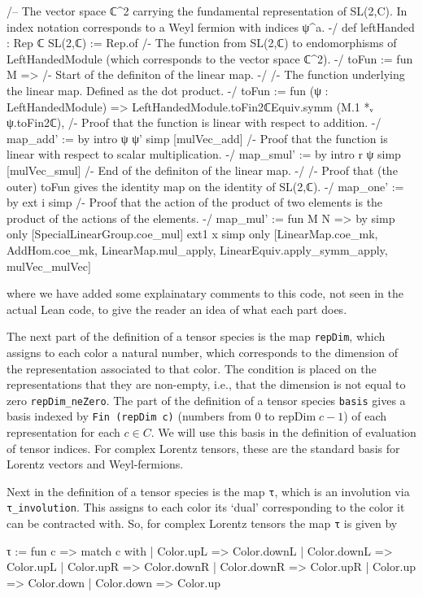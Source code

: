 \documentclass[a4paper, 11pt]{article}
\begin{document}
\begin{codeLong}
/-- The vector space ℂ^2 carrying the fundamental representation of SL(2,C).
  In index notation corresponds to a Weyl fermion with indices ψ^a. -/
def leftHanded : Rep ℂ SL(2,ℂ) := Rep.of {
  /- The function from SL(2,ℂ) to endomorphisms of LeftHandedModule 
    (which corresponds to the vector space ℂ^2). -/
  toFun := fun M => {
    /- Start of the definiton of the linear map. -/
    /- The function underlying the linear map. Defined as the dot product. -/
    toFun := fun (ψ : LeftHandedModule) =>
      LeftHandedModule.toFin2ℂEquiv.symm (M.1 *ᵥ ψ.toFin2ℂ),
    /- Proof that the function is linear with respect to addition. -/
    map_add' := by
      intro ψ ψ'
      simp [mulVec_add]
    /- Proof that the function is linear with respect to scalar multiplication. -/
    map_smul' := by
      intro r ψ
      simp [mulVec_smul]
    /- End of the definiton of the linear map. -/}
  /- Proof that (the outer) toFun gives the identity map on the identity of SL(2,ℂ). -/
  map_one' := by
    ext i
    simp
  /- Proof that the action of the product of two elements is 
    the product of the actions of the elements. -/
  map_mul' := fun M N => by
    simp only [SpecialLinearGroup.coe_mul]
    ext1 x
    simp only [LinearMap.coe_mk, AddHom.coe_mk, LinearMap.mul_apply, LinearEquiv.apply_symm_apply,
      mulVec_mulVec]}
\end{codeLong} 
where we have added some explainatary comments to this code, not seen in the actual Lean code, to give 
the reader an idea of what each part does. 

The next part of the definition of a tensor species is the map \lstinline|repDim|, which assigns to each color a natural number,
which corresponds to the dimension of the representation associated to that color. The condition is placed on the representations that they are non-empty, i.e., 
that the dimension is not equal to zero \lstinline|repDim_neZero|.  
The part of the definition of a tensor species \lstinline|basis| gives a basis indexed by \lstinline|Fin (repDim c)| (numbers from 0 to $\mathrm{repDim}\; c -1 $)  of each representation for each $c \in C$.  
We will use this basis in the definition of evaluation of tensor indices. For complex Lorentz tensors, 
these are the standard basis for Lorentz vectors and Weyl-fermions. 

Next in the definition of a  tensor species is the map 
\lstinline|τ|, which is an involution via \lstinline|τ_involution|.
This assigns to each color its `dual' corresponding to the color it can be contracted with. So, for complex Lorentz tensors 
the map \lstinline|τ| is given by 
\begin{code} 
τ := fun c =>
  match c with
  | Color.upL => Color.downL
  | Color.downL => Color.upL
  | Color.upR => Color.downR
  | Color.downR => Color.upR
  | Color.up => Color.down
  | Color.down => Color.up
\end{code}
\end{document}
